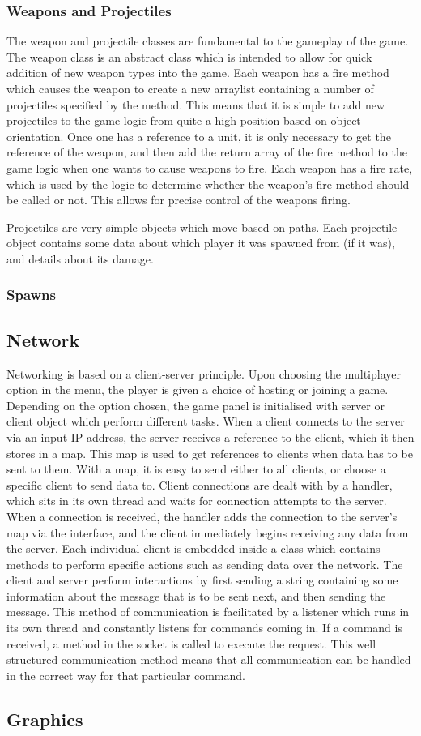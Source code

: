 \subsubsection{Weapons and Projectiles}
The weapon and projectile classes are fundamental to the gameplay of the game. The weapon class is an abstract class which is intended to allow for quick addition of new weapon types into the game. Each weapon has a fire method which causes the weapon to create a new arraylist containing a number of projectiles specified by the method. This means that it is simple to add new projectiles to the game logic from quite a high position based on object orientation. Once one has a reference to a unit, it is only necessary to get the reference of the weapon, and then add the return array of the fire method to the game logic when one wants to cause weapons to fire. Each weapon has a fire rate, which is used by the logic to determine whether the weapon's fire method should be called or not. This allows for precise control of the weapons firing.

Projectiles are very simple objects which move based on paths. Each projectile object contains some data about which player it was spawned from (if it was), and details about its damage.
\subsubsection{Spawns}

\subsection{Network}
Networking is based on a client-server principle. Upon choosing the multiplayer option in the menu, the player is given a choice of hosting or joining a game. Depending on the option chosen, the game panel is initialised with server or client object which perform different tasks. When a client connects to the server via an input IP address, the server receives a reference to the client, which it then stores in a map. This map is used to get references to clients when data has to be sent to them. With a map, it is easy to send either to all clients, or choose a specific client to send data to. Client connections are dealt with by a handler, which sits in its own thread and waits for connection attempts to the server. When a connection is received, the handler adds the connection to the server's map via the interface, and the client immediately begins receiving any data from the server. Each individual client is embedded inside a class which contains methods to perform specific actions such as sending data over the network. The client and server perform interactions by first sending a string containing some information about the message that is to be sent next, and then sending the message. This method of communication is facilitated by a listener which runs in its own thread and constantly listens for commands coming in. If a command is received, a method in the socket is called to execute the request. This well structured communication method means that all communication can be handled in the correct way for that particular command. 
\subsection{Graphics}


